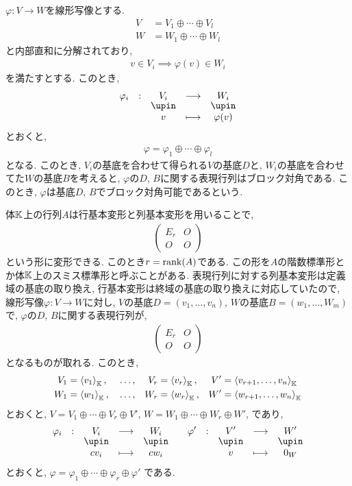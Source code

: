 $\varphi\colon V\to W$を線形写像とする.
\begin{align*}
V&=V_1\oplus \cdots \oplus V_l\\
W&=W_1\oplus \cdots \oplus W_l
\end{align*}
と内部直和に分解されており,
\begin{align*}
v\in V_i\implies \varphi(v) \in W_i
\end{align*}
を満たすとする.
このとき,
\begin{align*}
\shazo{\varphi_i}{V_i}{W_i}
{v}{\varphi(v)}
\end{align*}
とおくと,
\begin{align*}
\varphi=\varphi_1\oplus\cdots\oplus \varphi_l
\end{align*}
となる.
このとき, $V_i$の基底を合わせて得られる$V$の基底$D$と,
$W_i$の基底を合わせてた$W$の基底$B$を考えると,
$\varphi$の$D$, $B$に関する表現行列はブロック対角である.
このとき, $\varphi$は基底$D$, $B$でブロック対角可能であるという.

体$\mathbb{K}$上の行列$A$は行基本変形と列基本変形を用いることで,
\begin{align*}
\begin{pmatrix}E_r&O\\O&O\end{pmatrix}
\end{align*}
という形に変形できる.
このとき$r=\operatorname{rank}(A)$である.
この形を$A$の階数標準形とか体$\mathbb{K}$上のスミス標準形と呼ぶことがある.
表現行列に対する列基本変形は定義域の基底の取り換え,
行基本変形は終域の基底の取り換えに対応していたので,
線形写像$\varphi\colon V\to W$に対し,
$V$の基底$D=(v_1,\ldots,v_n)$,
$W$の基底$B=(w_1,\ldots,W_m)$
で,
$\varphi$の$D$, $B$に関する表現行列が,
\begin{align*}
\begin{pmatrix}E_r&O\\O&O\end{pmatrix}
\end{align*}
となるものが取れる.
このとき,
\begin{align*}
V_1&=\Braket{v_1}_{\mathbb{K}},
&&\ldots,&V_r&=\Braket{v_r}_{\mathbb{K}},&
V'&=\Braket{v_{r+1},\ldots,v_{n}}_{\mathbb{K}}\\
W_1&=\Braket{w_1}_{\mathbb{K}},
&&\ldots,&W_r&=\Braket{w_r}_{\mathbb{K}},&
W'&=\Braket{w_{r+1},\ldots,w_{n}}_{\mathbb{K}}
\end{align*}
とおくと,
$V=V_1\oplus\cdots\oplus V_r\oplus V'$,
$W=W_1\oplus\cdots\oplus W_r\oplus W'$,
であり,
\begin{align*}
\shazo{\varphi_i}{V_i}{W_i}
{cv_i}{cw_i}
&&
\shazo{\varphi'}{V'}{W'}
{v}{0_W}
\end{align*}
とおくと,
$\varphi=\varphi_1\oplus\cdots\oplus\varphi_r\oplus \varphi'$
である.


